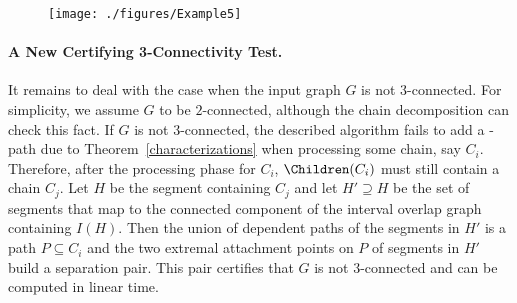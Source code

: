 \begin{figure}
{		\texttt{[image: ./figures/Example5]}
		\label{fig:Example4}
	}
	\hfill
	\label{fig:Example}
\end{figure}




\paragraph{A New Certifying 3-Connectivity Test.}\label{test}
It remains to deal with the case when the input graph $G$ is not $3$-connected. For simplicity, we assume $G$ to be $2$-connected, although the chain decomposition can check this fact. If $G$ is not $3$-connected, the described algorithm fails to add a \BG-path due to Theorem~\ref{characterizations} when processing some chain, say $C_i$. Therefore, after the processing phase for $C_i$, $\Children(C_i)$ must still contain a chain $C_j$. Let $H$ be the segment containing $C_j$ and let $H' \supseteq H$ be the set of segments that map to the connected component of the interval overlap graph containing $I(H)$. Then the union of dependent paths of the segments in $H'$ is a path $P \subseteq C_i$ and the two extremal attachment points on $P$ of segments in $H'$ build a separation pair. This pair certifies that $G$ is not $3$-connected and can be computed in linear time.